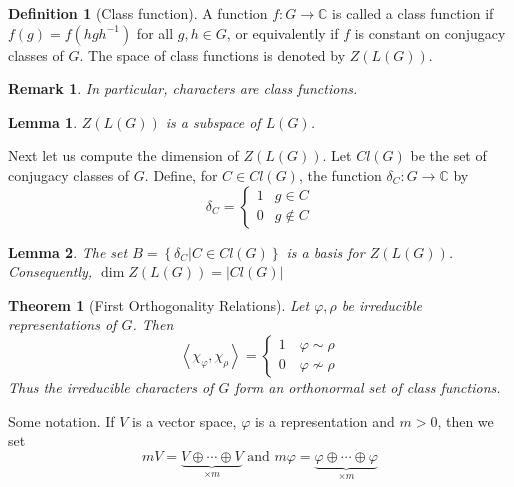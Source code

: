 \documentclass{article}
\newtheorem{Thm}{Theorem}[section]
\newtheorem{Lem}{Lemma}[section]
\newtheorem*{Rk}{Remark}
\theoremstyle{definition}
\newtheorem{Def}{Definition}[section]
\begin{document}
\begin{Def}[Class function]
    A function $f:G\to\mathbb{C}$ is called a class function if $f(g)=f(hgh^{-1})$ for all $g,h\in G$, or equivalently if $f$ is constant on conjugacy classes of $G$.
    The space of class functions is denoted by $Z(L(G))$.
\end{Def}
\begin{Rk}
    In particular, characters are class functions.
\end{Rk}

\begin{Lem}
    $Z(L(G))$ is a subspace of $L(G)$.
\end{Lem}
Next let us compute the dimension of $Z(L(G))$. Let $Cl(G)$ be the set of conjugacy classes of $G$.
Define, for $C\in Cl(G)$, the function $\delta_C:G\to\mathbb{C}$ by \[\delta_C=\left\{\begin{matrix}
    1 & g\in C\\
    0 & g\not\in C
   \end{matrix}\right.\]
\begin{Lem}
    The set $B=\left\{\delta_C|C\in Cl(G)\right\}$ is a basis for $Z(L(G))$. Consequently, $\dim Z(L(G))=\left|Cl(G)\right|$
\end{Lem}

\begin{Thm}[First Orthogonality Relations]
    Let $\varphi,\rho$ be irreducible representations of $G$. Then \begin{equation*}
        \left\langle\chi_\varphi,\chi_\rho\right\rangle=\left\{\begin{matrix}
            1\quad \varphi\sim\rho\\0\quad \varphi\not\sim\rho
           \end{matrix}\right.
    \end{equation*}
    Thus the irreducible characters of $G$ form an orthonormal set of class functions.
\end{Thm}

Some notation. If $V$ is a vector space, $\varphi$ is a representation and $m>0$, then we set 
\[mV=\underset{\times m}{\underbrace{V\oplus\cdots\oplus V} } \text{  and  }  m\varphi=\underset{\times m}{\underbrace{\varphi\oplus\cdots\oplus\varphi}}\]
\end{document}
